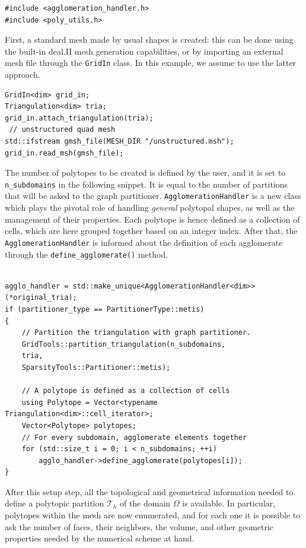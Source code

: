 \documentclass[a4paper,12pt]{article}
\begin{document}
\begin{lstlisting}[caption=New header files]
#include <agglomeration_handler.h>
#include <poly_utils.h>
\end{lstlisting}


First, a standard mesh made by usual shapes is created: this can be done using the built-in deal.II mesh generation capabilities,
or by importing an external mesh file through the \texttt{GridIn} class. In this example, we assume to use the latter approach.

\begin{lstlisting}[caption=Importing an external mesh]
GridIn<dim> grid_in;
Triangulation<dim> tria;
grid_in.attach_triangulation(tria);
 // unstructured quad mesh
std::ifstream gmsh_file(MESH_DIR "/unstructured.msh");
grid_in.read_msh(gmsh_file);
\end{lstlisting}

The number of polytopes to be created is defined by the user, and it is set to \texttt{n\_subdomains} in the following snippet. It is equal
to the number of partitions that will be asked to the graph partitioner. \texttt{AgglomerationHandler} is a new class which plays the pivotal role of
handling \emph{general} polytopal shapes, as well as the management of their properties. Each polytope is hence defined as a collection of cells, which are here grouped together based on an integer index. After
that, the \texttt{AgglomerationHandler} is informed about the definition of each agglomerate through the \texttt{define\_agglomerate()} method.

\begin{lstlisting}[caption=Creation of polytopal elements]
    
agglo_handler = std::make_unique<AgglomerationHandler<dim>>(*original_tria);
if (partitioner_type == PartitionerType::metis)
{
    // Partition the triangulation with graph partitioner.
    GridTools::partition_triangulation(n_subdomains,
    tria,
    SparsityTools::Partitioner::metis);

    // A polytope is defined as a collection of cells
    using Polytope = Vector<typename Triangulation<dim>::cell_iterator>;
    Vector<Polytope> polytopes;
    // For every subdomain, agglomerate elements together
    for (std::size_t i = 0; i < n_subdomains; ++i)
        agglo_handler->define_agglomerate(polytopes[i]);
}
\end{lstlisting}

After this setup step, all the topological and geometrical information needed to define a polytopic partition $\mathcal{T}_h$ of
the domain $\Omega$ is available. In particular, polytopes within the mesh are now enumerated, and for each one
it is possible to ask the number of faces, their neighbors, the volume, and other geometric properties needed by the numerical scheme
at hand.
\end{document}
